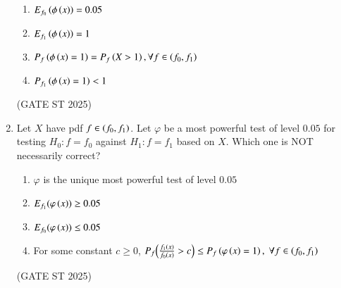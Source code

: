 \documentclass[journal,12pt,onecolumn]{IEEEtran}
\theoremstyle{remark}
\begin{document}
\begin{enumerate}
\begin{enumerate}
\item $E_{f_0}\left(\phi\left(x\right)\right) = 0.05$
\item $E_{f_1}\left(\phi\left(x\right)\right) = 1$
\item $P_f\left(\phi\left(x\right) = 1\right) = P_f\left(X > 1\right), \forall f \in\left(f_0, f_1\right)$
\item $P_{f_1}\left(\phi\left(x\right) = 1\right) < 1$
\end{enumerate}
\hfill{(GATE ST 2025)}
\item Let $X$ have pdf $f \in \left(f_0,f_1\right)$. Let $\varphi$ be a most powerful test of level $0.05$ for testing $H_0:f=f_0$ against $H_1:f=f_1$ based on $X$. Which one is NOT necessarily correct?

\begin{enumerate}
\item $\varphi$ is the unique most powerful test of level $0.05$
\item $E_{f_1}(\varphi\left(x\right)) \geq 0.05$
\item $E_{f_0}(\varphi\left(x\right)) \leq 0.05$
\item For some constant $c\geq 0$, 
$P_f\!\left( \frac{f_1\left(x\right)}{f_0\left(x\right)} > c \right) \leq P_f\left(\varphi\left(x\right)=1\right), \; \forall f\in \left(f_0,f_1\right)$
\end{enumerate}
\hfill{(GATE ST 2025)}


\end{enumerate}
\end{document}
